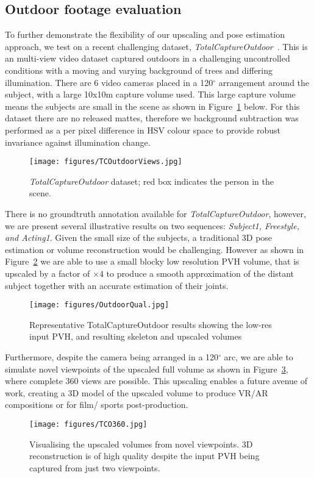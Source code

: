 \documentclass[runningheads]{llncs}
\begin{document}
\subsection{Outdoor footage evaluation}
To further demonstrate the flexibility of our upscaling and pose estimation approach, we test on a recent challenging dataset, \emph{TotalCaptureOutdoor}~\cite{Malleson3DV17}. This is an multi-view video dataset captured outdoors in a challenging uncontrolled conditions with a moving and varying background of trees and differing illumination. There are 6 video cameras placed in a 120$^\circ$ arrangement around the subject, with a large 10x10m capture volume used. This large capture volume means the subjects are small in the scene as shown in Figure~\ref{fig:TCoutdoorviews} below. For this dataset there are no released mattes, therefore we background subtraction was performed as a per pixel difference in HSV colour space to provide robust invariance against illumination change.
\begin{figure}[htb]
\centering
\texttt{[image: figures/TCOutdoorViews.jpg]}
\caption{{\em TotalCaptureOutdoor} dataset; red box indicates the person in the scene.}
\label{fig:TCoutdoorviews}
\end{figure}
There is no groundtruth annotation available for \emph{TotalCaptureOutdoor}, however, we are present several illustrative results on two sequences: {\em Subject1, Freestyle, and Acting1}. Given the small size of the subjects, a traditional 3D pose estimation or volume reconstruction would be challenging. However as shown in Figure~\ref{fig:OutdoorQual} we are able to use a small blocky low resolution PVH volume, that is upscaled by a factor of $ \times 4$ to produce a smooth approximation of the distant subject together with an accurate estimation of their joints. 
\begin{figure}[htb]
\centering
\texttt{[image: figures/OutdoorQual.jpg]}
\caption{Representative TotalCaptureOutdoor results showing  the low-res input PVH, and resulting skeleton and upscaled volumes}
\label{fig:OutdoorQual}
\squeezeup
\squeezeup
\end{figure}
Furthermore, despite the camera being arranged in a 120$^\circ$ arc, we are able to simulate novel viewpoints of the upscaled full volume as shown in Figure~\ref{fig:TCO360}, where complete 360 views are possible. This upscaling enables a future avenue of work, creating a  3D model of the upscaled volume to produce VR/AR compositions or for film/ sports post-production.
\begin{figure}[htb]
\centering
\texttt{[image: figures/TCO360.jpg]}
\caption{Visualising the upscaled volumes from novel viewpoints.  3D reconstruction is of high quality despite the input PVH being captured from just two viewpoints.}
\label{fig:TCO360}
\end{figure}
\end{document}

